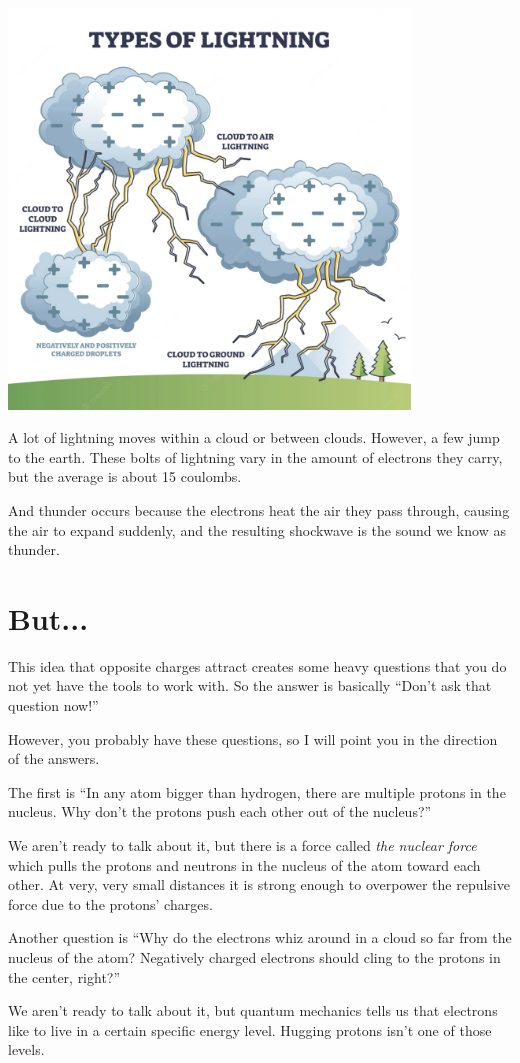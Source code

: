 \includegraphics[width=0.8\textwidth]{Lightning_Diagram.png}

A lot of lightning moves within a cloud or between clouds. However, a
few jump to the earth. These bolts of lightning vary in the amount of
electrons they carry, but the average is about 15 coulombs.

And thunder occurs because the electrons heat the air they pass through, 
causing the air to expand suddenly, and the resulting shockwave is the sound we know as thunder.
\section{But...}

This idea that opposite charges attract creates some heavy questions
that you do not yet have the tools to work with. So the answer is
basically ``Don't ask that question now!''

However, you probably have these questions, so I will point you in
the direction of the answers.

The first is ``In any atom bigger than hydrogen, there are multiple
protons in the nucleus. Why don't the protons push each other out of
the nucleus?''

We aren't ready to talk about it, but there is a force called \textit{the
 nuclear force} which pulls the protons and neutrons in the nucleus
of the atom toward each other. At very, very small distances it is
strong enough to overpower the repulsive force due to the protons'
charges.

Another question is ``Why do the electrons whiz around in a cloud so
far from the nucleus of the atom? Negatively charged electrons should
cling to the protons in the center, right?''

We aren't ready to talk about it, but quantum mechanics tells us that
electrons like to live in a certain specific energy level. Hugging
protons isn't one of those levels.
